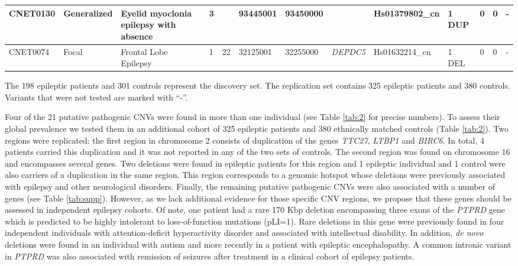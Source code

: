 \begin{table}[!ht]
{\begin{tabular}{|l|l|p{}|l|l|l|l|l|l|l|l|l|l|}
      CNET0130 & Generalized & Eyelid myoclonia epilepsy with absence  & 3            &                     & 93445001  & 93450000  &                       & Hs01379802\_cn  & 1 DUP            & 0               & 0                   & -                  \\
      \hline
      CNET0074 & Focal       & Frontal Lobe  Epilepsy                  & 1            & 22                  & 32125001  & 32255000  & {\it DEPDC5}                & Hs01632214\_cn  & 1 DEL            & 0               & 0                   & -                  \\
      \hline
    \end{tabular}
  }
  \begin{flushleft}
    The 198 epileptic patients and 301 controls represent the discovery set. The replication set contains 325 epileptic patients and 380 controls. Variants that were not tested are marked with ``-''.
  \end{flushleft}
  \label{tab:1}
\end{table}


Four of the 21 putative pathogenic CNVs were found in more than one individual (see Table \ref{tab:2} for precise numbers).
To assess their global prevalence we tested them in an additional cohort of 325 epileptic patients and 380 ethnically matched controls (Table \ref{tab:2}).
Two regions were replicated: the first region in chromosome 2 consists of duplication of the genes \textit{TTC27}, \textit{LTBP1} and \textit{BIRC6}.
In total, 4 patients carried this duplication and it was not reported in any of the two sets of controls.
The second region was found on chromosome 16 and encompasses several genes.
Two deletions were found in epileptic patients for this region and 1 epileptic individual and 1 control were also carriers of a duplication in the same region.
This region corresponds to a genomic hotspot whose deletions were previously associated with epilepsy\cite{Mefford2010} and other neurological disorders.
Finally, the remaining putative pathogenic CNVs were also associated with a number of genes (see Table \ref{tab:supp}).
However, as we lack additional evidence for those specific CNV regions, we propose that these genes should be assessed in independent epilepsy cohorts.
Of note, one patient had a rare 170 Kbp deletion encompassing three exons of the \textit{PTPRD} gene which is predicted to be highly intolerant to loss-of-function mutations (pLI=1)\cite{Lek2016}.
Rare deletions in this gene were previously found in four independent individuals with attention-deficit hyperactivity disorder\cite{Elia2010} and associated with intellectual disability\cite{Choucair2015}.
In addition, {\it de novo} deletions were found in an individual with autism\cite{Pinto2010} and more recently in a patient with epileptic encephalopathy\cite{Mefford2015}.
A common intronic variant in {\it PTPRD} was also associated with remission of seizures after treatment in a clinical cohort of epilepsy patients\cite{Speed2014a}.


